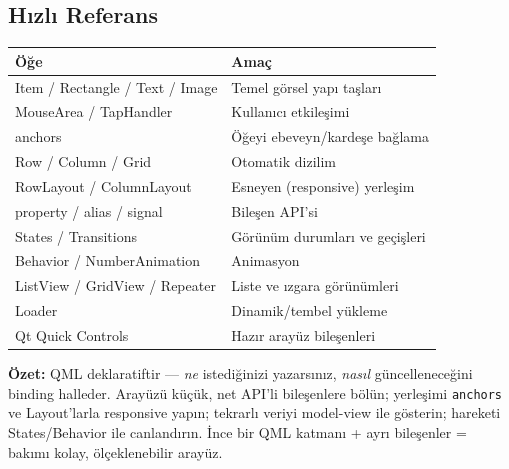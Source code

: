 \documentclass[11pt,a4paper]{article}
\newcommand{\kod}[1]{\texttt{\color{koyuGri}#1}}
\begin{document}
\subsection{Hızlı Referans}

\begin{center}
\begin{tabularx}{\textwidth}{@{}>{\ttfamily\color{anaMavi}\small}l >{\raggedright\arraybackslash}X@{}}
\toprule
\rowcolor{acikMavi}\color{anaMavi}\textbf{Öğe} & \color{anaMavi}\textbf{Amaç} \\
\midrule
Item / Rectangle / Text / Image & Temel görsel yapı taşları \\
\rowcolor{acikGri} MouseArea / TapHandler & Kullanıcı etkileşimi \\
anchors & Öğeyi ebeveyn/kardeşe bağlama \\
\rowcolor{acikGri} Row / Column / Grid & Otomatik dizilim \\
RowLayout / ColumnLayout & Esneyen (responsive) yerleşim \\
\rowcolor{acikGri} property / alias / signal & Bileşen API'si \\
States / Transitions & Görünüm durumları ve geçişleri \\
\rowcolor{acikGri} Behavior / NumberAnimation & Animasyon \\
ListView / GridView / Repeater & Liste ve ızgara görünümleri \\
\rowcolor{acikGri} Loader & Dinamik/tembel yükleme \\
Qt Quick Controls & Hazır arayüz bileşenleri \\
\bottomrule
\end{tabularx}
\end{center}

\vspace{0.6cm}
\begin{tcolorbox}[colback=qtYesil!8,colframe=qtYesil!70!koyuGri,arc=3pt,boxrule=1pt]
\centering
\textbf{Özet:} QML deklaratiftir — \emph{ne} istediğinizi yazarsınız, \emph{nasıl}
güncelleneceğini binding halleder. Arayüzü küçük, net API'li bileşenlere bölün;
yerleşimi \kod{anchors} ve Layout'larla responsive yapın; tekrarlı veriyi
model-view ile gösterin; hareketi States/Behavior ile canlandırın. İnce bir QML
katmanı + ayrı bileşenler = bakımı kolay, ölçeklenebilir arayüz.
\end{tcolorbox}
\end{document}
